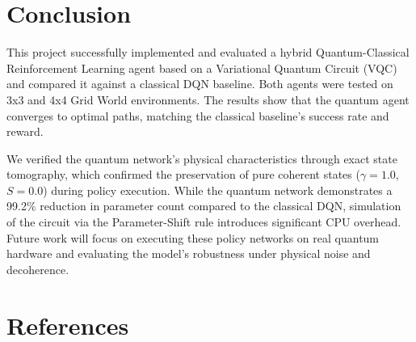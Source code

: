 \documentclass[12pt, a4paper]{article}
\begin{document}
\section{Conclusion}

This project successfully implemented and evaluated a hybrid Quantum-Classical Reinforcement Learning agent based on a Variational Quantum Circuit (VQC) and compared it against a classical DQN baseline. Both agents were tested on 3x3 and 4x4 Grid World environments. The results show that the quantum agent converges to optimal paths, matching the classical baseline's success rate and reward. 

We verified the quantum network's physical characteristics through exact state tomography, which confirmed the preservation of pure coherent states ($\gamma = 1.0$, $S=0.0$) during policy execution. While the quantum network demonstrates a 99.2\% reduction in parameter count compared to the classical DQN, simulation of the circuit via the Parameter-Shift rule introduces significant CPU overhead. Future work will focus on executing these policy networks on real quantum hardware and evaluating the model's robustness under physical noise and decoherence.

\newpage


\section{References}
\end{document}
